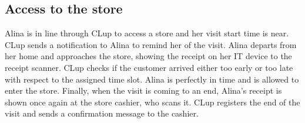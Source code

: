 \documentclass[../../main.tex]{subfiles}
\begin{document}
    \subsection{Access to the store}

    Alina is in line through CLup to access a store and her visit start time is near. 
    CLup sends a notification to Alina to remind her of the visit. 
    Alina departs from her home and approaches the store, showing the receipt on her IT device to the receipt scanner. 
    CLup checks if the customer arrived either too early or too late with respect to the assigned time slot. 
    Alina is perfectly in time and is allowed to enter the store. Finally, when the visit is coming to an end, 
    Alina's receipt is shown once again at the store cashier, who scans it. 
    CLup registers the end of the visit and sends a confirmation message to the cashier.
\end{document}
